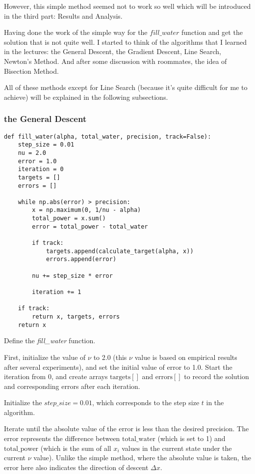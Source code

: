 \documentclass[a4paper,12pt]{article}
\begin{document}
    However, this simple method seemed not to work so well which will be introduced in the third part: Results and Analysis.

    Having done the work of the simple way for the $fill\_water$ function and get the solution that is not quite well. I started to think of the algorithms that I learned in the lectures: the General Descent, the Gradient Descent, Line Search, Newton's Method. And after some discussion with roommates, the idea of Bisection Method.

    All of these methods except for Line Search (because it's quite difficult for me to achieve) will be explained in the following subsections.
    \subsubsection{the General Descent}
\begin{lstlisting}
def fill_water(alpha, total_water, precision, track=False):
    step_size = 0.01
    nu = 2.0
    error = 1.0
    iteration = 0
    targets = []
    errors = []
    
    while np.abs(error) > precision:
        x = np.maximum(0, 1/nu - alpha)
        total_power = x.sum()
        error = total_power - total_water
        
        if track:
            targets.append(calculate_target(alpha, x))
            errors.append(error)
        
        nu += step_size * error
        
        iteration += 1
        
    if track:
        return x, targets, errors
    return x
\end{lstlisting}
Define the \textit{fill\_water} function.

First, initialize the value of \( \nu \) to 2.0 (this \( \nu \) value is based on empirical results after several experiments), and set the initial value of \( \text{error} \) to 1.0. Start the iteration from 0, and create arrays \( \text{targets}[] \) and \( \text{errors}[] \) to record the solution and corresponding errors after each iteration.

Initialize the $step\_size = 0.01$, which corresponds to the step size $t$ in the algorithm.

Iterate until the absolute value of the error is less than the desired precision. The error represents the difference between \( \text{total\_water} \) (which is set to 1) and \( \text{total\_power} \) (which is the sum of all \( x_i \) values in the current state under the current \( \nu \) value). Unlike the simple method, where the absolute value is taken, the error here also indicates the direction of descent \( \Delta x \).
\end{document}
